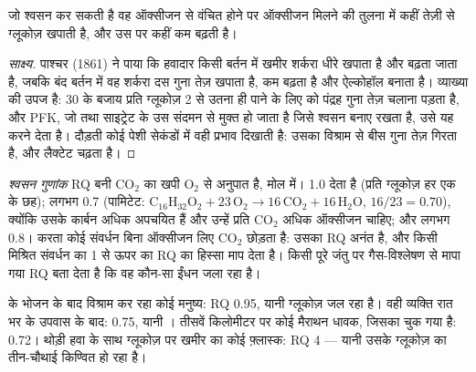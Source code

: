 \begin{proposition}[पाश्चर प्रभाव]\label{prop:b1:respiration-fermentation:pasteur}
जो  श्वसन कर सकती है वह ऑक्सीजन से वंचित होने पर ऑक्सीजन मिलने की
तुलना में कहीं तेज़ी से ग्लूकोज़ खपाती है, और उस पर कहीं कम बढ़ती है।
\end{proposition}
\begin{proof}[साक्ष्य]
पाश्चर (1861) ने पाया कि हवादार किसी बर्तन में खमीर शर्करा धीरे खपाता है
और बढ़ता जाता है, जबकि बंद बर्तन में वह शर्करा दस गुना तेज़ खपाता है,
कम बढ़ता है और ऐल्कोहॉल बनाता है। व्याख्या  की उपज है: 30 के बजाय
प्रति ग्लूकोज़ 2 से उतना ही  पाने के लिए  को
 पंद्रह गुना तेज़ चलाना पड़ता है, और PFK, जो  तथा
साइट्रेट के उस संदमन से मुक्त हो जाता है जिसे श्वसन बनाए रखता है, उसे यह
करने देता है। दौड़ती कोई पेशी सेकंडों में वही प्रभाव दिखाती है: उसका
 विश्राम से बीस गुना तेज़ गिरता है, और लैक्टेट चढ़ता है।
\end{proof}

\begin{definition}[श्वसन गुणांक]\label{def:b1:respiration-fermentation:rq}
\emph{श्वसन गुणांक} RQ बनी $\mathrm{CO_2}$ का खपी $\mathrm{O_2}$ से
अनुपात है, मोल में।  1.0 देता है
(प्रति ग्लूकोज़ हर एक के छह);  लगभग 0.7 (पामिटेट:
$\mathrm{C_{16}H_{32}O_2} + 23\,\mathrm{O_2} \to 16\,\mathrm{CO_2} +
16\,\mathrm{H_2O}$, $16/23 = 0.70$), क्योंकि उसके कार्बन अधिक अपचयित हैं
और उन्हें प्रति $\mathrm{CO_2}$ अधिक ऑक्सीजन चाहिए; और  लगभग 0.8।
 करता कोई संवर्धन बिना ऑक्सीजन लिए $\mathrm{CO_2}$ छोड़ता है: उसका
RQ अनंत है, और किसी मिश्रित संवर्धन का 1 से ऊपर का RQ  का हिस्सा
माप देता है। किसी पूरे जंतु पर गैस-विश्लेषण से मापा गया RQ बता देता है कि
वह कौन-सा ईंधन जला रहा है।
\end{definition}

\begin{example}[कोई RQ पढ़ना]\label{ex:b1:respiration-fermentation:readrq}
 के भोजन के बाद विश्राम कर रहा कोई मनुष्य: RQ 0.95, यानी
ग्लूकोज़ जल रहा है। वही व्यक्ति रात भर के उपवास के बाद: 0.75, यानी ।
तीसवें किलोमीटर पर कोई मैराथन धावक, जिसका  चुक गया है: 0.72।
थोड़ी हवा के साथ ग्लूकोज़ पर खमीर का कोई फ़्लास्क: RQ 4 --- यानी उसके
ग्लूकोज़ का तीन-चौथाई किण्वित हो रहा है।
\end{example}

